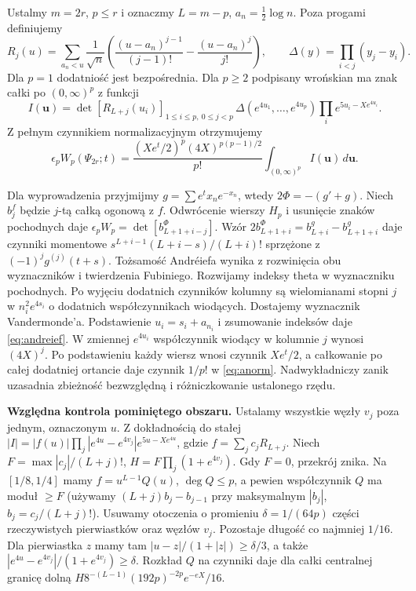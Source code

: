 \documentclass[11pt,a4paper,reqno]{amsart}
\numberwithin{equation}{section}
\begin{document}
Ustalmy \(m=2r\), \(p\le r\) i oznaczmy \(L=m-p\), \(a_n=\frac12\log n\). Poza progami definiujemy \[R_j(u)=\sum_{a_n<u}\frac{1}{\sqrt n}\left(\frac{(u-a_n)^{j-1}}{(j-1)!}-\frac{(u-a_n)^j}{j!}\right),\qquad \Delta(y)=\prod_{i<j}(y_j-y_i).\] Dla \(p=1\) dodatniość jest bezpośrednia. Dla \(p\ge2\) podpisany wrońskian ma znak całki po \((0,\infty)^p\) z funkcji 
\begin{equation}\label{eq:andreief}
I(\mathbf u)=\det[R_{L+j}(u_i)]_{1\le i\le p,\ 0\le j<p}\,
 \Delta(e^{4u_1},\ldots,e^{4u_p})\prod_i e^{5u_i-Xe^{4u_i}}.
\end{equation}
Z pełnym czynnikiem normalizacyjnym otrzymujemy
\begin{equation}\label{eq:anorm}
 \epsilon_p W_p(\Psi_{2r};t)=
 \frac{(Xe^t/2)^p(4X)^{p(p-1)/2}}{p!}
 \int_{(0,\infty)^p} I(\mathbf u)\,d\mathbf u .
\end{equation}

 Dla wyprowadzenia przyjmijmy \(g=\sum e^t x_ne^{-x_n}\), wtedy \(2\Phi=-(g'+g)\). Niech \(b_j^f\) będzie \(j\)-tą całką ogonową z \(f\). Odwrócenie wierszy \(H_p\) i usunięcie znaków pochodnych daje \(\epsilon_pW_p=\det[b^\Phi_{L+1+i-j}]\). Wzór \(2b_{L+1+i}^\Phi=b^g_{L+i}-b^g_{L+1+i}\) daje czynniki momentowe \(s^{L+i-1}(L+i-s)/(L+i)!\) sprzężone z \((-1)^j g^{(j)}(t+s)\). Tożsamość Andréiefa wynika z rozwinięcia obu wyznaczników i twierdzenia Fubiniego. Rozwijamy indeksy theta w wyznaczniku pochodnych. Po wyjęciu dodatnich czynników kolumny są wielomianami stopni \(j\) w \(n_i^2e^{4s_i}\) o dodatnich współczynnikach wiodących. Dostajemy wyznacznik Vandermonde'a. Podstawienie \(u_i=s_i+a_{n_i}\) i zsumowanie indeksów daje \eqref{eq:andreief}. W zmiennej \(e^{4u_i}\) współczynnik wiodący w kolumnie \(j\) wynosi \((4X)^j\). Po podstawieniu każdy wiersz wnosi czynnik \(Xe^t/2\), a całkowanie po całej dodatniej ortancie daje czynnik \(1/p!\) w \eqref{eq:anorm}. Nadwykładniczy zanik uzasadnia zbieżność bezwzględną i różniczkowanie ustalonego rzędu.

\textbf{Względna kontrola pominiętego obszaru.} Ustalamy wszystkie węzły \(v_j\) poza jednym, oznaczonym \(u\). Z dokładnością do stałej \(|I|=|f(u)|\prod_j|e^{4u}-e^{4v_j}|e^{5u-Xe^{4u}}\), gdzie \(f=\sum_j c_jR_{L+j}\). Niech \(F=\max |c_j|/(L+j)!\), \(H=F\prod_j(1+e^{4v_j})\). Gdy \(F=0\), przekrój znika. Na \([1/8,1/4]\) mamy \(f=u^{L-1}Q(u)\), \(\deg Q\le p\), a pewien współczynnik \(Q\) ma moduł \(\ge F\) (używamy \((L+j)b_j-b_{j-1}\) przy maksymalnym \(|b_j|\), \(b_j=c_j/(L+j)!\)). Usuwamy otoczenia o promieniu \(\delta=1/(64p)\) części rzeczywistych pierwiastków oraz węzłów \(v_j\). Pozostaje długość co najmniej \(1/16\). Dla pierwiastka \(z\) mamy tam \(|u-z|/(1+|z|)\ge\delta/3\), a także \(|e^{4u}-e^{4v_j}|/(1+e^{4v_j})\ge\delta\). Rozkład \(Q\) na czynniki daje dla całki centralnej granicę dolną \(H8^{-(L-1)}(192p)^{-2p}e^{-eX}/16\).
\end{document}
